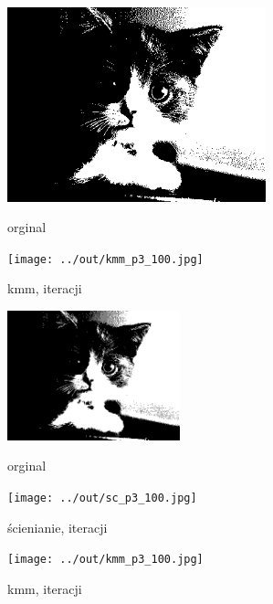 \documentclass[a4paper,12pt]{article}
\begin{document}
\begin{figure}[h!]
\begin{minipage}[t]{7.5cm}
\begin{center}
\includegraphics[width=7.5cm]{../in/p3.jpg}
\caption{orginal}
\end{center}
\end{minipage}
\hfill
\begin{minipage}[t]{7.5cm}
\begin{center}
\texttt{[image: ../out/kmm\_p3\_100.jpg]}
\caption{kmm, \protect iteracji}
\end{center}
\end{minipage}
\end{figure}

\begin{figure}[h!]
\begin{minipage}[t]{5cm}
\begin{center}
\includegraphics[width=5cm]{../in/p3.jpg}
\caption{orginal}
\end{center}
\end{minipage}
\hfill
\begin{minipage}[t]{5cm}
\begin{center}
\texttt{[image: ../out/sc\_p3\_100.jpg]}
\caption{ścienianie, \protect iteracji}
\end{center}
\end{minipage}
\hfill
\begin{minipage}[t]{5cm}
\begin{center}
\texttt{[image: ../out/kmm\_p3\_100.jpg]}
\caption{kmm, \protect iteracji}
\end{center}
\end{minipage}
\end{figure}
\end{document}
